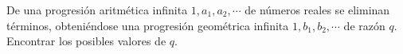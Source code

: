 De una progresión aritmética infinita $1,a_1,a_2, \cdots$ de números reales se eliminan términos, obteniéndose una progresión geométrica infinita $1,b_1,b_2, \cdots$ de razón $q$. Encontrar los posibles valores de $q$.
